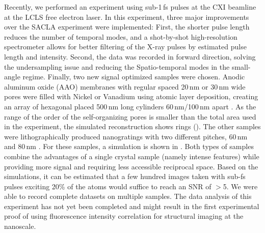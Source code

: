 Recently, we performed an experiment using sub-1\,fs pulses at the CXI beamline at the LCLS free electron laser. In this experiment, three major improvements over the SACLA experiment were implemented: First, the shorter pulse length reduces the number of temporal modes, and a shot-by-shot high-resolution spectrometer allows for better filtering of the X-ray pulses by estimated pulse length and intensity. Second, the data was recorded in forward direction, solving the undersampling issue and reducing the Spatio-temporal modes in the small-angle regime. Finally, two new signal optimized samples were chosen. Anodic aluminum oxide (AAO) membranes with regular spaced 20\,nm or 30\,nm wide pores were filled with Nickel or Vanadium using atomic layer deposition, creating an array of hexagonal placed 500\,nm long cylinders 60\,nm/100\,nm apart \cite{carina2019}. As the range of the order of the self-organizing pores is smaller than the total area used in the experiment, the simulated reconstruction shows rings ().  The other samples were lithographically produced nanogratings with two different pitches, 60\,nm  and 80\,nm \cite{mojarad2015}. For these samples, a simulation is shown in . Both types of samples combine the advantages of a single crystal sample (namely intense features) while providing more signal and requiring less accessible reciprocal space. 
Based on the simulations, it can be estimated that a few hundred images taken with sub-fs pulses exciting 20\% of the atoms would suffice to reach an SNR of $>$5.
We were able to record complete datasets on multiple samples. The data analysis of this experiment has not yet been completed and might result in the first experimental proof of using fluorescence intensity correlation for structural imaging at the nanoscale.  



